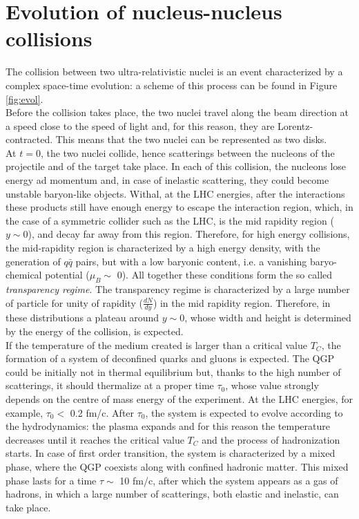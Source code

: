 \section{Evolution of nucleus-nucleus collisions}
The collision between two ultra-relativistic nuclei is an event characterized by a complex space-time evolution: a scheme of this process can be found in Figure \ref{fig:evol}.\\
Before the collision takes place, the two nuclei travel along the beam direction at a speed close to the speed of light and, for this reason, they are Lorentz-contracted. This means that the two nuclei can be represented as two disks.\\
At $t=0$, the two nuclei collide, hence scatterings between the nucleons of the projectile and of the target take place. In each of this collision, the nucleons lose energy ad momentum and, in case of inelastic scattering, they could become unstable baryon-like objects. Withal, at the LHC energies, after the interactions these products still have enough energy to escape the interaction region, which, in the case of a symmetric collider such as the LHC, is the mid rapidity region ($y\sim0$), and decay far away from this region. Therefore, for high energy collisions, the mid-rapidity region is characterized by a high energy density, with the generation of $q\bar{q}$ pairs, but with a low baryonic content, i.e. a vanishing baryo-chemical potential ($\mu_{B}\sim$ 0). All together these conditions form the so called \textit{transparency regime}. The transparency regime is characterized by a large number of particle for unity of rapidity ($\frac{dN}{dy}$) in the mid rapidity region. Therefore, in these distributions a plateau around $y\sim0$, whose width and height is determined by the energy of the collision, is expected.\\
If the temperature of the medium created is larger than a critical value $T_{C}$, the formation of a system of deconfined quarks and gluons is expected. The QGP could be initially not in thermal equilibrium but, thanks to the high number of scatterings, it should thermalize at a proper time $\tau_{0}$, whose value strongly depends on the centre of mass energy of the experiment. At the LHC energies, for example, $\tau_{0}<$ 0.2 fm/c. After $\tau_{0}$, the system is expected to evolve according to the hydrodynamics: the plasma expands and for this reason the temperature decreases until it reaches the critical value $T_{C}$ and the process of hadronization starts. In case of first order transition, the system is characterized by a mixed phase, where the QGP coexists along with confined hadronic matter. This mixed phase lasts for a time $\tau\sim$ 10 fm/c, after which the system appears as a gas of hadrons, in which a large number of scatterings, both elastic and inelastic, can take place.
